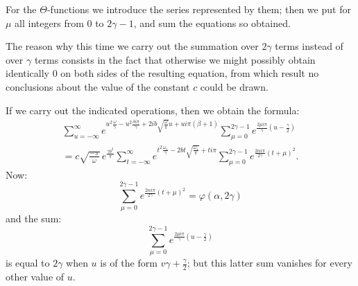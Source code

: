 \documentclass[10pt]{article}
\begin{document}
For the \(\Theta\)-functions we introduce the series represented by them; then we put for \(\mu\) all integers from 0 to \(2\gamma-1\), and sum the equations so obtained.

The reason why this time we carry out the summation over \(2\gamma\) terms instead of over \(\gamma\) terms consists in the fact that otherwise we might possibly obtain identically 0 on both sides of the resulting equation, from which result no conclusions about the value of the constant \(c\) could be drawn.

If we carry out the indicated operations, then we obtain the formula:
\begin{multline*}
\sum_{u=-\infty}^{\infty}
 e^{u^{2}\frac{\omega}{\gamma}-u^{2}\frac{\delta i\pi}{\gamma}+2ib\sqrt{\frac{\omega}{\pi}}u+ui\pi(\beta+1)}
\sum_{\mu=0}^{2\gamma-1}e^{\frac{2\mu i\pi}{\gamma}\left(u-\frac{\gamma}{2}\right)}\\
=c\sqrt{\frac{-\pi}{\omega}}\,e^{\frac{\gamma b^{2}}{\pi}}
\sum_{t=-\infty}^{\infty}e^{t^{2}\frac{\omega_{1}}{\gamma}-2bt\sqrt{\frac{\omega_{1}}{\pi}}+ti\pi}
\sum_{\mu=0}^{2\gamma-1}e^{\frac{2\alpha i\pi}{2\gamma}(t+\mu)^{2}}.
\end{multline*}
Now:
\[
\sum_{\mu=0}^{2\gamma-1}e^{\frac{2\alpha i\pi}{2\gamma}(t+\mu)^{2}}=\varphi(\alpha,2\gamma)
\]
and the sum:
\[
\sum_{\mu=0}^{2\gamma-1}e^{\frac{2\mu i\pi}{\gamma}\left(u-\frac{\gamma}{2}\right)}
\]
is equal to \(2\gamma\) when \(u\) is of the form \(v\gamma+\frac{\gamma}{2}\); but this latter sum vanishes for every other value of \(u\).
\end{document}

